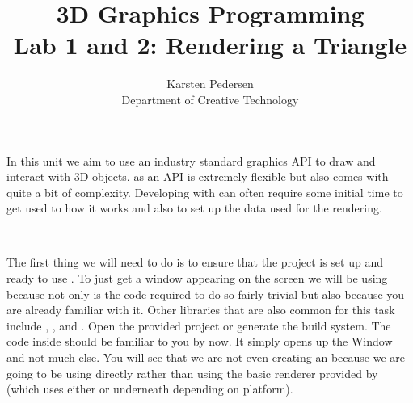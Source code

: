 \documentclass[10pt]{article}
\begin{document}
\title{3D Graphics Programming \\
  \large Lab 1 and 2: Rendering a Triangle}

\author{Karsten Pedersen\\ Department of Creative Technology}
\maketitle

In this unit we aim to use an industry standard graphics API to draw
and interact with 3D objects.  as an API is extremely flexible
but also comes with quite a bit of complexity.  Developing with 
can often require some initial time to get used to how it works and also
to set up the data used for the rendering.

\

The first thing we will need to do is to ensure that the project is
set up and ready to use . To just get a window appearing
on the screen we will be using  because not only is the code
required to do so fairly trivial but also because you are already familiar
with it.  Other libraries that are also common for this task include
, ,  and . Open
the provided  project or generate
the  build system.  The code inside 
should be familiar to you by now. It simply opens up the 
Window and not much else.  You will see that we are not even creating an
 because we are going to be using 
directly rather than using the basic renderer provided by 
(which uses either  or  underneath depending
on platform).

\end{document}
